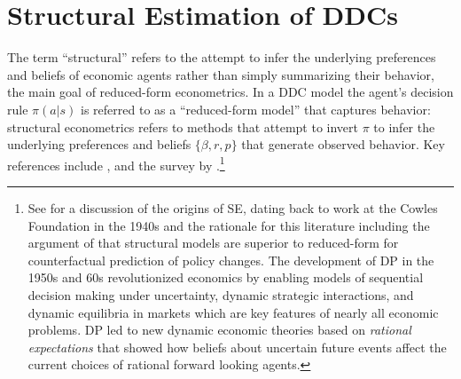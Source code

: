 \section{Structural Estimation of DDCs\label{sec:ddc}}

The term ``structural'' refers to the attempt to infer the underlying preferences and beliefs of economic
agents rather than simply summarizing their behavior, the main goal of reduced-form econometrics.
In a DDC model the agent's decision rule $\pi(a|s)$ is referred to as a ``reduced-form model'' that captures behavior: structural econometrics 
refers to methods that attempt to invert $\pi$ to infer the underlying preferences and beliefs $\{\beta,r,p\}$ that generate observed behavior. 
Key references include \citet{rust:1987}, \citet{rust:1994} and 
the survey by \citet{AguirregabiriaMira:2010}.\footnote{\footnotesize See \citet{rust:2014} for a discussion 
of the origins of SE, dating back to work at the Cowles Foundation in the 1940s and the rationale for this literature including
the argument of \citet{lucas:1976} that structural models are superior to reduced-form for counterfactual prediction of policy changes.
The development of DP in the 1950s and 60s 
revolutionized economics by enabling models of sequential
decision making under uncertainty, dynamic strategic interactions, and dynamic equilibria 
in markets which are key features of nearly all economic problems.  DP led to new dynamic economic theories
based on {\it rational expectations\/} that
showed how beliefs about uncertain future events affect the current choices of rational forward looking agents.}

